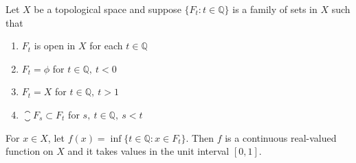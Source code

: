 \begin{lemma}
	Let \( X \) be a topological space and suppose \( \{ F_t : t \in \mathbb{Q} \} \) is a family of sets in \( X \) such that 
	\begin{enumerate}
		\item \( F_t \) is open in \( X \) for each \( t \in \mathbb{Q} \)
		\item \( F_t = \phi \) for \( t \in \mathbb{Q},\ t < 0 \)
		\item \( F_t = X \) for \( t \in \mathbb{Q},\ t > 1 \)
		\item \( \closure{F_s} \subset F_t \) for \( s,\ t \in \mathbb{Q},\ s < t \)
	\end{enumerate}
	For \( x \in X \), let \( f(x) = \inf \{ t \in \mathbb{Q} : x \in F_t \} \).
	Then \( f \) is a continuous real-valued function on \( X \) and it takes values in the unit interval \( [0,1] \).
\end{lemma}
